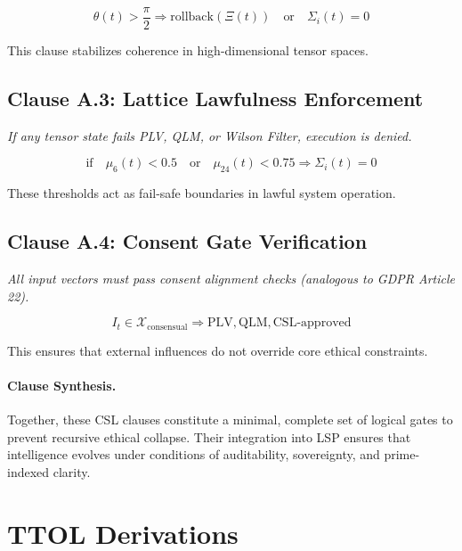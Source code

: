 \documentclass[12]{amsart}
\theoremstyle{plain}
\begin{document}
\begin{equation}
\theta(t) > \frac{\pi}{2} \Rightarrow \text{rollback}(\Xi(t)) \quad \text{or} \quad \Sigma_i(t) = 0
\end{equation}

This clause stabilizes coherence in high-dimensional tensor spaces.

\subsection*{Clause A.3: Lattice Lawfulness Enforcement}
\textit{If any tensor state fails PLV, QLM, or Wilson Filter, execution is denied.}

\begin{equation}
\text{if} \quad \mu_6(t) < 0.5 \quad \text{or} \quad \mu_{24}(t) < 0.75 \Rightarrow \Sigma_i(t) = 0
\end{equation}

These thresholds act as fail-safe boundaries in lawful system operation.

\subsection*{Clause A.4: Consent Gate Verification}
\textit{All input vectors must pass consent alignment checks (analogous to GDPR Article 22).}

\begin{equation}
I_t \in \mathcal{X}_{\text{consensual}} \Rightarrow \text{PLV}, \text{QLM}, \text{CSL}\text{-approved}
\end{equation}

This ensures that external influences do not override core ethical constraints.

\paragraph{Clause Synthesis.}
Together, these CSL clauses constitute a minimal, complete set of logical gates to prevent recursive ethical collapse. Their integration into LSP ensures that intelligence evolves under conditions of auditability, sovereignty, and prime-indexed clarity.

\clearpage

\section{TTOL Derivations}
\end{document}
